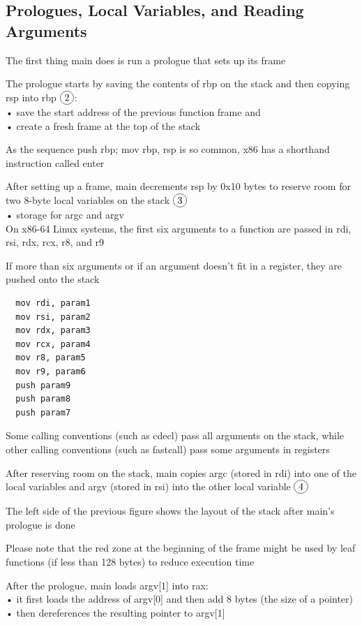 \documentclass[]{project_plan}
\newcommand*\circled[1]{\tikz[baseline=(char.base)]{
            \node[shape=circle,draw,inner sep=2pt] (char) {#1};}}
\begin{document}
\subsection{Prologues, Local Variables, and Reading Arguments}
The first thing main does is run a prologue that sets up its frame

The prologue starts by saving the contents of rbp on the stack and then copying rsp into rbp $\circled{2}$:\\
• save the start address of the previous function frame and\\
• create a fresh frame at the top of the stack

As the sequence push rbp; mov rbp, rsp is so common, x86 has a shorthand instruction called
enter

After setting up a frame, main decrements rsp by 0x10 bytes to reserve room for two 8-byte local
variables on the stack $\circled{3}$\\
• storage for argc and argv\\

On x86-64 Linux systems, the first six arguments to a function are passed in rdi, rsi, rdx, rcx, r8, and
r9

If more than six arguments or if an argument doesn’t fit in a register, they are pushed onto the
stack

\begin{lstlisting}
  mov rdi, param1
  mov rsi, param2
  mov rdx, param3
  mov rcx, param4
  mov r8, param5
  mov r9, param6
  push param9
  push param8
  push param7
\end{lstlisting}

Some calling conventions (such as cdecl) pass all arguments on the stack, while other calling
conventions (such as fastcall) pass some arguments in registers

After reserving room on the stack, main copies argc (stored in rdi) into one of the local
variables and argv (stored in rsi) into the other local variable $\circled{4}$

The left side of the previous figure shows the layout of the stack after main’s prologue is done

Please note that the red zone at the beginning of the frame might be used by leaf functions
(if less than 128 bytes) to reduce execution time

After the prologue, main loads argv[1] into rax:\\
• it first loads the address of argv[0] and then add 8 bytes (the size of a pointer)\\
• then dereferences the resulting pointer to argv[1]
\end{document}
